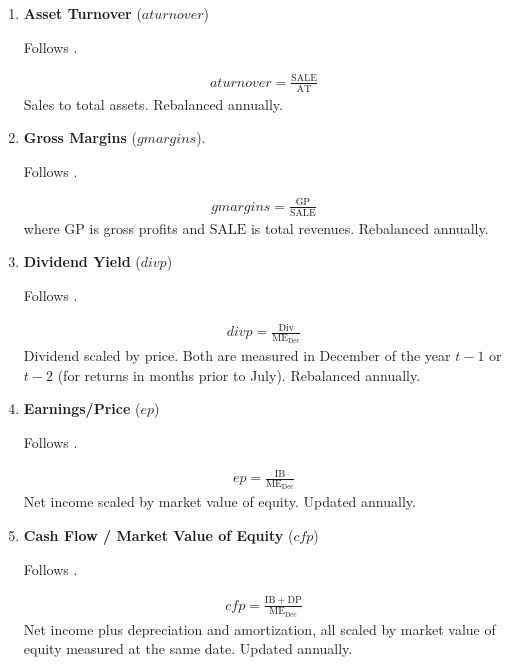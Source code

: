 \begin{enumerate}
	\item \textbf{Asset Turnover} ($aturnover$) 
	
	Follows .
	
	\begin{align*}
		aturnover = \frac{ \mathrm{SALE} }{ \mathrm{AT} }
	\end{align*}	
	Sales to total assets. Rebalanced annually.
	
	
	
	\item \textbf{Gross Margins} ($gmargins$). 
	
	Follows .
	
	\begin{align*}
		gmargins = \frac{ \mathrm{GP} }{ \mathrm{SALE} }
	\end{align*}
	where $\mathrm{GP}$ is gross profits and $\mathrm{SALE}$ is total revenues. Rebalanced annually.
	 
	 
	 
	\item \textbf{Dividend Yield} ($divp$) 
	
	Follows . 
	
	\begin{align*}
		divp = \frac{ \mathrm{Div} }{ \mathrm{ME}_{\text{Dec}} }
	\end{align*}
	Dividend scaled by price. Both are measured in December of the year $t-1$ or $t-2$ (for returns in months prior to July). Rebalanced annually.
	
	
	
	\item \textbf{Earnings/Price} ($ep$)
	
	Follows .
	
	\begin{align*}
		ep = \frac{ \mathrm{IB} }{ \mathrm{ME}_{\text{Dec}} }
	\end{align*}
	Net income scaled by market value of equity. Updated annually.
	
	
	
	\item \textbf{Cash Flow / Market Value of Equity} ($cfp$) 
	
	Follows . 
	
	\begin{align*}
		cfp = \frac{ \mathrm{IB} + \mathrm{DP} }{ \mathrm{ME}_{\text{Dec}} }
	\end{align*}
	Net income plus depreciation and amortization, all scaled by market value of equity measured at the same date. Updated annually.
	

\end{enumerate}
